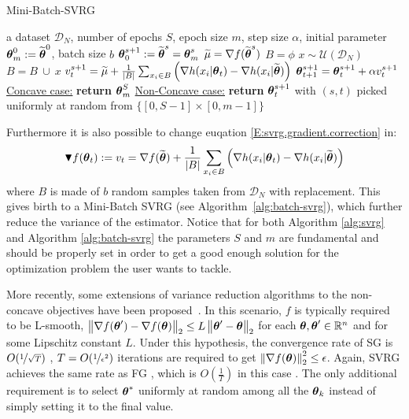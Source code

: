 \begin{algorithm}[h]
	\caption{Mini-Batch-SVRG}
	\label{alg:batch-svrg}
	\begin{algorithmic}
		 a dataset $\mathcal{D}_N$, number of epochs $S$, epoch size $m$, step size $\alpha$, initial parameter $\vtheta_{m}^0:=\wt{\vtheta}^0$, batch size $b$
		\STATE $\vtheta_0^{s+1} := \wt{\vtheta}^{s} = \vtheta_{m}^s$
		\STATE $\wt{\mu} = \nabla f(\wt{\vtheta}^s)$
		\STATE $B=\phi$
		\STATE $x \sim \mathcal{U}\left(\mathcal{D}_N\right)$
		\STATE $B=B ~\cup~ x$
		\ENDFOR
		\STATE $v^{s+1}_t = 
		\wt{\mu} + 
		\frac{1}{\left|B\right|}\sum_{x_i\in B} \left(\nabla h(x_i | \vtheta_t) - \nabla h(x_i | \wt{\vtheta})\right)
		$
		\STATE $\vtheta_{t+1}^{s+1} = \vtheta_t^{s+1} + \alpha v^{s+1}_t$
		\ENDFOR
		\ENDFOR
		\STATE \underline{Concave case:} \textbf{return} $\vtheta_{m}^S$
		\STATE \underline{Non-Concave case:} \textbf{return} $\vtheta_t^{s+1}$ with $(s,t)$ picked uniformly at random from $\{[0,S-1]\times[0,m-1]\}$
	\end{algorithmic}
\end{algorithm}

Furthermore it is also possible to change euqation \ref{E:svrg.gradient.correction} in:
\begin{equation}\label{E:batch.svrg.gradient.correction}
\blacktriangledown f(\vtheta_{t}) := v_t = \nabla f(\wt{\vtheta}) + \frac{1}{\left|B\right|}\sum_{x_i\in B} \left(\nabla h(x_i | \vtheta_t) - \nabla h(x_i | \wt{\vtheta})\right)
\end{equation}
where $B$ is made of $b$ random samples taken from $\mathcal{D}_N$ with replacement. This gives birth to a Mini-Batch \acs{SVRG} \citep{reddi2016stochastic} (see Algorithm~\ref{alg:batch-svrg}), which further reduce the variance of the estimator. Notice that for both Algorithm \ref{alg:svrg} and Algorithm \ref{alg:batch-svrg} the parameters $S$ and $m$ are fundamental and should be properly set in order to get a good enough solution for the optimization problem the user wants to tackle.\newline

More recently, some extensions of variance reduction algorithms to the non-concave objectives have been proposed~\citep[\eg][]{allen2016variance,reddi2016stochastic,reddi2016fast}. In this scenario, $f$ is typically required to be L-smooth, \ie $\norm[2]{\nabla f(\vtheta') - \nabla f(\vtheta)} \leq L\norm[2]{\vtheta'-\vtheta}$ for each $\vtheta,\vtheta'\in\realspace^n$ and for some Lipschitz constant $L$. Under this hypothesis, the convergence rate of \acs{SG} is $O(\nicefrac{1}{\sqrt{T}})$ \citep{ghadimi2013stochastic}, \ie $T=O(\nicefrac{1}{\epsilon^2})$ iterations are required to get $\norm[2]{\nabla f(\vtheta)}^2\leq\epsilon$. Again, \acs{SVRG} achieves the same rate as \acs{FG} \citep{reddi2016stochastic}, which is $O(\frac{1}{T})$ in this case \citep{nesterov2013introductory}. The only additional requirement is to select $\vtheta^*$ uniformly at random among all the $\vtheta_k$ instead of simply setting it to the final value.
\vspace{-0.05in}
